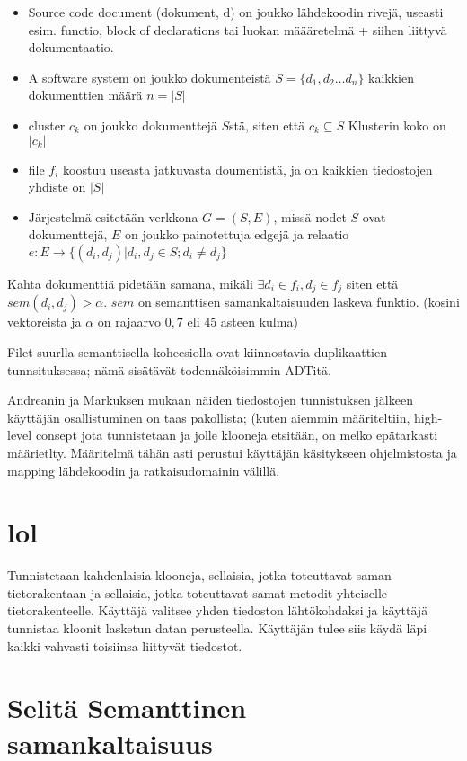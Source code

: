 \documentclass[finnish]{../tktltiki2}
\theoremstyle{definition}
\theoremstyle{remark}
\begin{document}
\begin{itemize}
  \item Source code document (dokument, d)
    on joukko lähdekoodin rivejä, useasti esim. functio, block of declarations tai luokan määäretelmä + siihen liittyvä
    dokumentaatio.

  \item A software system
    on joukko dokumenteistä $S = \{d_1,d_2\dots d_n\}$ %
    kaikkien dokumenttien määrä $n = |S|$

  \item cluster $c_k$
  on joukko dokumenttejä $S$stä, siten että $c_k \subseteq S$ Klusterin koko on $|c_k|$

  \item file $f_i$
    koostuu useasta jatkuvasta doumentistä, ja on kaikkien tiedostojen yhdiste on $|S|$

  \item Järjestelmä esitetään verkkona
    $G=(S,E)$, missä nodet $S$ ovat dokumenttejä, $E$ on joukko painotettuja edgejä ja relaatio
    $e: E \to \{(d_i,d_j) | d_i, d_j \in S; d_i \neq d_j  \}$

\end{itemize}
Kahta dokumenttiä pidetään samana, mikäli $\exists d_i \in f_i, d_j \in f_j $ siten että $sem(d_i, d_j) > \alpha$.
$sem$ on semanttisen samankaltaisuuden laskeva funktio. (kosini vektoreista ja $\alpha$ on rajaarvo $0,7$ eli $45$
asteen kulma)

Filet suurlla semanttisella koheesiolla ovat kiinnostavia duplikaattien tunnsituksessa; nämä sisätävät todennäköisimmin
ADTitä.

Andreanin ja Markuksen mukaan näiden tiedostojen tunnistuksen jälkeen käyttäjän osallistuminen on taas pakollista;
(kuten aiemmin määriteltiin, high-level consept jota tunnistetaan ja jolle klooneja etsitään, on melko epätarkasti
määrietlty. Määritelmä tähän asti perustui käyttäjän käsitykseen ohjelmistosta ja mapping lähdekoodin ja
ratkaisudomainin välillä.

\section{lol}

Tunnistetaan kahdenlaisia klooneja, sellaisia, jotka toteuttavat saman tietorakentaan ja sellaisia, jotka toteuttavat
samat metodit yhteiselle tietorakenteelle. Käyttäjä valitsee yhden tiedoston lähtökohdaksi ja käyttäjä tunnistaa kloonit
lasketun datan perusteella. Käyttäjän tulee siis käydä läpi kaikki vahvasti toisiinsa liittyvät tiedostot.






\section{Selitä Semanttinen samankaltaisuus}



















\end{document}

